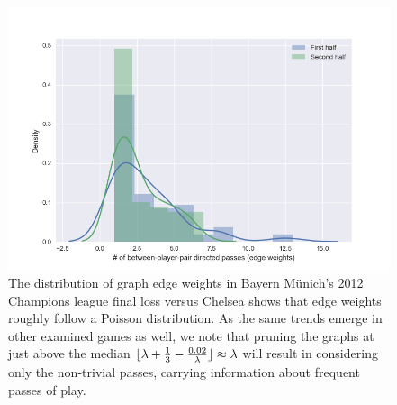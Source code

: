 \documentclass[9pt,twocolumn,twoside]{pnas-report}
\DeclarePairedDelimiter\floor{\lfloor}{\rfloor}
\begin{document}
\begin{figure}[t]\centering
	\includegraphics[width=0.8\linewidth]{BayernPassWeightComparison.png}
	\caption{The distribution of graph edge weights in Bayern Münich's 2012 Champions league final loss versus Chelsea shows that edge weights roughly follow a Poisson distribution. As the same trends emerge in other examined games as well, we note that pruning the graphs at just above the median $\floor{\lambda + \frac{1}{3} - \frac{0.02}{\lambda}} \approx \lambda$ will result in considering only the non-trivial passes, carrying information about frequent passes of play.}
	\label{fig:BayernWeights}
\end{figure}
\end{document}
